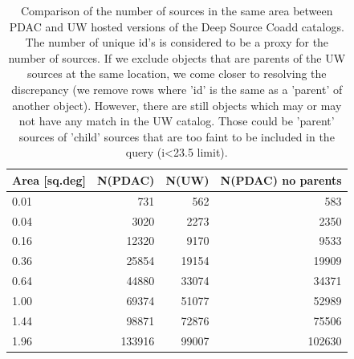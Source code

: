 \documentclass[DM,lsstdraft,toc]{lsstdoc}
\begin{document}
\begin{table}
\centering
\caption{Comparison of the number of sources in the same area between PDAC and UW hosted versions of the Deep Source Coadd catalogs. The number of unique id's is considered to be a proxy for the number of sources. If we exclude objects that are parents of the UW sources at the same location, we come closer to resolving  the discrepancy (we remove rows where   'id' is the same as a 'parent' of another object). However, there are still objects which may or may not have any match in the UW catalog. Those could be 'parent' sources of 'child' sources that are too faint to be included in the query (i<23.5 limit). }
\label{tab:source_count}
\begin{tabular}{ l|rrr}
\hline
Area [sq.deg]  & N(PDAC)   & N(UW)  &  N(PDAC) no parents \\
\hline
0.01    & 731       & 562    &  583    \\
0.04    & 3020      & 2273   & 2350    \\
0.16    & 12320     & 9170   & 9533    \\
0.36    & 25854     & 19154  & 19909   \\
0.64    & 44880     & 33074  & 34371   \\
1.00    & 69374     & 51077  & 52989   \\
1.44    & 98871     & 72876  &  75506  \\
1.96    & 133916    & 99007  & 102630  \\
\end{tabular}
\end{table}



\end{document}
